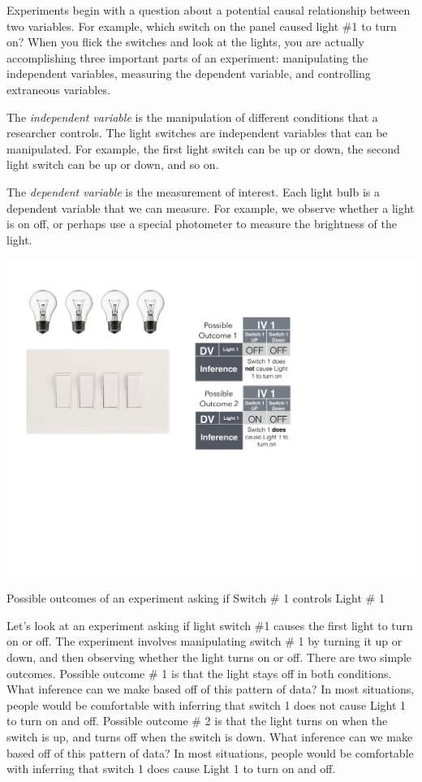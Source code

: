 Experiments begin with a question about a potential causal relationship between two variables. For example, which switch on the panel caused light \#1 to turn on? When you flick the switches and look at the lights, you are actually accomplishing three important parts of an experiment: manipulating the independent variables, measuring the dependent variable, and controlling extraneous variables.

The \emph{independent variable} is the manipulation of different conditions that a researcher controls. The light switches are independent variables that can be manipulated. For example, the first light switch can be up or down, the second light switch can be up or down, and so on. 

The \emph{dependent variable} is the measurement of interest. Each light bulb is a dependent variable that we can measure. For example, we observe whether a light is on off, or perhaps use a special photometer to measure the brightness of the light.

\begin{marginfigure}[0in]
\includegraphics[width=\linewidth]{figures/Light2.pdf}
\caption{Possible outcomes of an experiment asking if Switch \# 1 controls Light \# 1}
\label{fig:confound}
\end{marginfigure}

Let's look at an experiment asking if light switch \#1 causes the first light to turn on or off. The experiment involves manipulating switch \# 1 by turning it up or down, and then observing whether the light turns on or off. There are two simple outcomes. Possible outcome \# 1 is that the light stays off in both conditions. What inference can we make based off of this pattern of data? In most situations, people would be comfortable with inferring that switch 1 does not cause Light 1 to turn on and off. Possible outcome \# 2 is that the light turns on when the switch is up, and turns off when the switch is down. What inference can we make based off of this pattern of data? In most situations, people would be comfortable with inferring that switch 1 does  cause Light 1 to turn on and off. 

